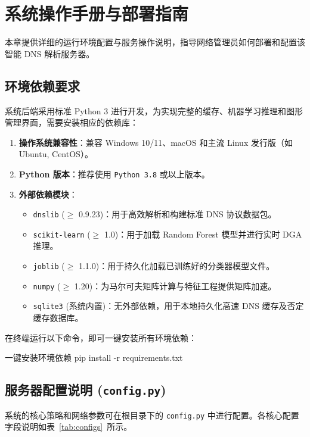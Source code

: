 \documentclass[11pt,a4paper]{ctexart}
\begin{document}
\section{系统操作手册与部署指南}
本章提供详细的运行环境配置与服务操作说明，指导网络管理员如何部署和配置该智能 DNS 解析服务器。

\subsection{环境依赖要求}
系统后端采用标准 Python 3 进行开发，为实现完整的缓存、机器学习推理和图形管理界面，需要安装相应的依赖库：
\begin{enumerate}
    \item \textbf{操作系统兼容性}：兼容 Windows 10/11、macOS 和主流 Linux 发行版（如 Ubuntu, CentOS）。
    \item \textbf{Python 版本}：推荐使用 \texttt{Python 3.8} 或以上版本。
    \item \textbf{外部依赖模块}：
    \begin{itemize}
        \item \texttt{dnslib} ($\ge$ 0.9.23)：用于高效解析和构建标准 DNS 协议数据包。
        \item \texttt{scikit-learn} ($\ge$ 1.0)：用于加载 Random Forest 模型并进行实时 DGA 推理。
        \item \texttt{joblib} ($\ge$ 1.1.0)：用于持久化加载已训练好的分类器模型文件。
        \item \texttt{numpy} ($\ge$ 1.20)：为马尔可夫矩阵计算与特征工程提供矩阵加速。
        \item \texttt{sqlite3} (系统内置)：无外部依赖，用于本地持久化高速 DNS 缓存及否定缓存数据库。
    \end{itemize}
\end{enumerate}

在终端运行以下命令，即可一键安装所有环境依赖：
\begin{codecard}{一键安装环境依赖}
pip install -r requirements.txt
\end{codecard}

\subsection{服务器配置说明 (\texttt{config.py})}
系统的核心策略和网络参数可在根目录下的 \texttt{config.py} 中进行配置。各核心配置字段说明如表~\ref{tab:configs}~所示。
\end{document}
